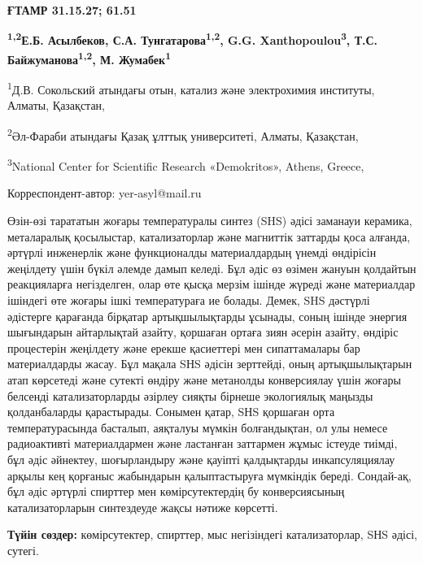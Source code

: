 \newpage
{\bfseries ҒТАМР 31.15.27; 61.51}


\begin{center}
{\bfseries \textsuperscript{1,2}Е.Б. Асылбеков, С.А. Тунгатарова\textsuperscript{1,2}, G.G. Xanthopoulou\textsuperscript{3}, Т.С. Байжуманова\textsuperscript{1,2}, М. Жумабек\textsuperscript{1}}

\textsuperscript{1}Д.В. Сокольский атындағы отын, катализ және
электрохимия институты, Алматы, Қазақстан,

\textsuperscript{2}Әл-Фараби атындағы Қазақ ұлттық университеті, Алматы,
Қазақстан,

\textsuperscript{3}National Center for Scientific Research «Demokritos»,
Athens, Greece,

Корреспондент-автор: yer-asyl@mail.ru
\end{center}

Өзін-өзі тарататын жоғары температуралы синтез (SHS) әдісі заманауи
керамика, металаралық қосылыстар, катализаторлар және магниттік заттарды
қоса алғанда, әртүрлі инженерлік және функционалды материалдардың үнемді
өндірісін жеңілдету үшін бүкіл әлемде дамып келеді. Бұл әдіс өз өзімен
жануын қолдайтын реакцияларға негізделген, олар өте қысқа мерзім ішінде
жүреді және материалдар ішіндегі өте жоғары ішкі температураға ие
болады. Демек, SHS дәстүрлі әдістерге қарағанда бірқатар артықшылықтарды
ұсынады, соның ішінде энергия шығындарын айтарлықтай азайту, қоршаған
ортаға зиян әсерін азайту, өндіріс процестерін жеңілдету және ерекше
қасиеттері мен сипаттамалары бар материалдарды жасау. Бұл мақала SНS
әдісін зерттейді, оның артықшылықтарын атап көрсетеді және сутекті
өндіру және метанолды конверсиялау үшін жоғары белсенді катализаторларды
әзірлеу сияқты бірнеше экологиялық маңызды қолданбаларды қарастырады.
Сонымен қатар, SНS қоршаған орта температурасында басталып, аяқталуы
мүмкін болғандықтан, ол улы немесе радиоактивті материалдармен және
ластанған заттармен жұмыс істеуде тиімді, бұл әдіс әйнектеу,
шоғырландыру және қауіпті қалдықтарды инкапсуляциялау арқылы кең
қорғаныс жабындарын қалыптастыруға мүмкіндік береді. Сондай-ақ, бұл әдіс
әртүрлі спирттер мен көмірсутектердің бу конверсиясының катализаторларын
синтездеуде жақсы нәтиже көрсетті.

{\bfseries Түйін сөздер:} көмірсутектер, спирттер, мыс негізіндегі
катализаторлар, SНS әдісі, сутегі.

